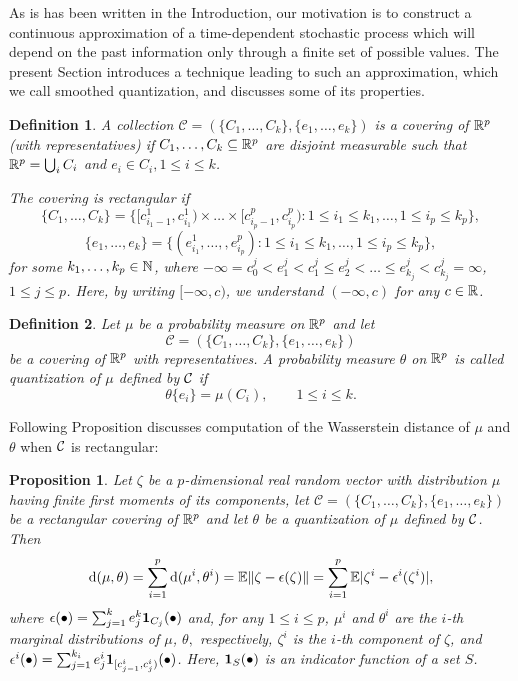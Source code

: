 \documentclass{article}              %
\newtheorem{definition}{Definition}
\newtheorem{proposition}{Proposition}
\begin{document}
As is has been written in the Introduction, our motivation is to construct a continuous approximation of a time-dependent stochastic process which will depend on the past information only through a finite set of possible values. The present Section introduces a technique leading to such an approximation, which we call smoothed quantization,
and discusses some of its properties. 
\begin{definition}
\label{def:cov}A collection $\mathcal{C}=(\{C_{1},\dots,C_{k}\},\{e_{1},\dots,e_{k}\})$
is a \emph{covering} \emph{of} $\mathbb{R}^{p}$ \emph{(with representatives)}
if $C_{1},\dots,C_{k}\subseteq\mathbb{R}^{p}$ are disjoint measurable such that $\mathbb{R}^{p}=\bigcup_{i}C_{i}$
and $e_{i}\in C_{i},1\leq i\leq k$. 

The covering is \emph{rectangular}
if 
\[
\{C_{1},\dots,C_{k}\}=\{[c_{i_{1}-1}^{1},c_{i_{1}}^{1})\times\dots\times[c_{i_{p}-1}^{p},c_{i_{p}}^{p}):1\leq i_{1}\leq k_{1},\dots,1\leq i_{p}\leq k_{p}\},
\]
\[
\{e_{1},\dots,e_{k}\}=\{(e_{i_{1}}^{1},\dots,,e_{i_{p}}^{p}):1\leq i_{1}\leq k_{1},\dots,1\leq i_{p}\leq k_{p}\},
\]
for some $k_{1},\dots,k_{p}\in\mathbb{N}$, where $-\infty=c_{0}^{j}<e_{1}^{j}<c_{1}^{j}\leq e_{2}^{j}<\dots\leq e_{k_{j}}^{j}<c_{k_{j}}^{j}=\infty$,
$1\leq j\leq p$. Here, by writing $[-\infty,c)$, we understand $(-\infty,c)$ for any $c\in \mathbb{R}$.
\end{definition}

\begin{definition}
Let $\mu$ be a probability measure on $\mathbb{R}^{p}$ and let $$\mathcal{C}=(\{C_{1},\dots,C_{k}\},\{e_{1},\dots,e_{k}\})$$
be a covering of $\mathbb{R}^{p}$ with representatives. A probability measure $\theta$ on $\mathbb{R}^{p}$
is called \emph{quantization of $\mu$ defined by $\mathcal{C}$} if 
\[
\theta\{e_{i}\}=\mu(C_{i}),\qquad1\leq i\leq k.
\]
\end{definition}

\noindent Following Proposition discusses computation of the Wasserstein distance of  $\mu$ and $\theta$
when $\mathcal{C}$ is rectangular:
\begin{proposition}
\label{prop:thesis}Let $\zeta$ be a $p$-dimensional real random
vector with distribution $\mu$ having finite first moments of its components, let $\mathcal{C}=(\{C_{1},\dots,C_{k}\},\{e_{1},\dots,e_{k}\})$
be a rectangular covering of $\mathbb{R}^{p}$ and let $\theta$ be a quantization
of $\mu$ defined by $\mathcal{C}$. Then 
\begin{equation}
\mathrm{d}(\mu,\theta)=\sum_{i=1}^{p}\mathrm{d}(\mu^{i},\theta^{i})=\mathbb{E}\|\zeta-\epsilon(\zeta)\|=\sum_{i=1}^{p}\mathbb{E}|\zeta^{i}-\epsilon^{i}(\zeta^{i})|,\label{eq:dis2-2-1}
\end{equation}
where $\epsilon(\bullet)=\sum_{j=1}^{k}e_{j}^{k}\mathbf{1}_{C_{j}}(\bullet)$
and, for any $1\leq i \leq p$, $\mu^{i}$ and $\theta^{i}$ are the $i$-th marginal
distributions of $\mu$, $\theta,$ respectively, $\zeta^{i}$ is
the $i$-th component of $\zeta$, and $\epsilon^{i}(\bullet)=\sum_{j=1}^{k_{i}}e_{j}^{i}\mathbf{1}_{[c_{j-1}^{i},c_{j}^{i})}(\bullet)$. Here, $\mathbf{1}_S(\bullet)$ is an indicator function of a set $S$.
\end{proposition}
\end{document}
